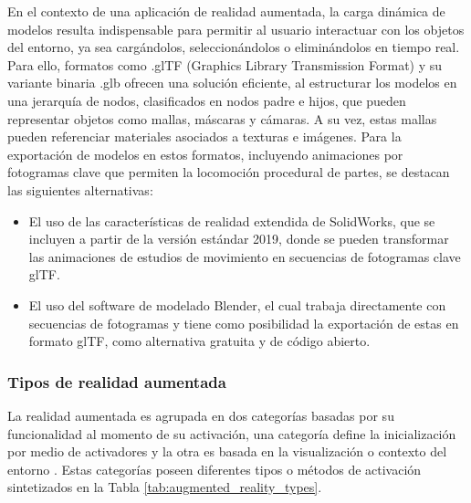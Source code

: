            En el contexto de una aplicación de realidad aumentada, la carga dinámica de modelos resulta indispensable para permitir al usuario interactuar con los objetos del entorno, ya sea cargándolos, seleccionándolos o eliminándolos en tiempo real. Para ello, formatos como .glTF (Graphics Library Transmission Format) y su variante binaria .glb ofrecen una solución eficiente, al estructurar los modelos en una jerarquía de nodos, clasificados en nodos padre e hijos, que pueden representar objetos como mallas, máscaras y cámaras. A su vez, estas mallas pueden referenciar materiales asociados a texturas e imágenes. Para la exportación de modelos en estos formatos, incluyendo animaciones por fotogramas clave que permiten la locomoción procedural de partes, se destacan las siguientes alternativas:

            \begin{itemize}

                \item El uso de las características de realidad extendida de SolidWorks, que se incluyen a partir de la versión estándar 2019, donde se pueden transformar las animaciones de estudios de movimiento en secuencias de fotogramas clave glTF.
                
                \item El uso del software de modelado Blender, el cual trabaja directamente con secuencias de fotogramas y tiene como posibilidad la exportación de estas en formato glTF, como alternativa gratuita y de código abierto.
                
            \end{itemize}

        \subsubsection{Tipos de realidad aumentada}

            La realidad aumentada es agrupada en dos categorías basadas por su funcionalidad al momento de su activación, una categoría define la inicialización por medio de activadores y la otra es basada en la visualización o contexto del entorno \parencite{STEWART:2016}. Estas categorías poseen diferentes tipos o métodos de activación sintetizados en la Tabla \ref{tab:augmented_reality_types}.

            